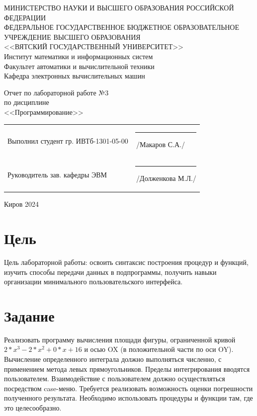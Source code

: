 \documentclass[a4paper,14pt]{extarticle}
\begin{document}
  \newpage\thispagestyle{empty}
  \begin{center}
    \MakeUppercase{
      Министерство науки и высшего образования Российской Федерации\\
      Федеральное государственное бюджетное образовательное учреждение высшего образования\\
      <<Вятский Государственный Университет>>\\
    }
    Институт математики и информационных систем\\
    Факультет автоматики и вычислительной техники\\
    Кафедра электронных вычислительных машин
  \end{center}
  \vfill

  \begin{center}
    Отчет по лабораторной работе №3\\
    по дисциплине\\
    <<Программирование>>\\
  \end{center}
  \vfill

  \noindent
  \begin{tabular}{ll}
    Выполнил студент гр. ИВТб-1301-05-00 \hspace{5mm} &
    \rule[-1mm]{25mm}{0.10mm}\,/Макаров С.А./\\
    
    Руководитель зав. кафедры ЭВМ & \rule[-1mm]{25mm}{0.10mm}\,/Долженкова М.Л./\\
  \end{tabular}

  \vfill
  \begin{center}
    Киров 2024
  \end{center}

  \newpage
  \section*{Цель}
  Цель лабораторной работы: освоить синтаксис построения процедур и функций, изучить способы передачи данных в подпрограммы, получить навыки организации минимального пользовательского интерфейса.

  \section*{Задание}
  Реализовать программу вычисления площади фигуры, ограниченной кривой
  $2 * x^3 -2 * x^2 + 0 * x + 16$ и осью OX (в положительной части по оси OY). Вычисление определенного интеграла должно выполняться численно, с применением метода левых прямоугольников. Пределы интегрирования вводятся пользователем. Взаимодействие с пользователем должно осуществляться посредством case-меню. Требуется реализовать возможность оценки погрешности полученного результата. Необходимо использовать процедуры и функции там, где это целесообразно.
\end{document}
